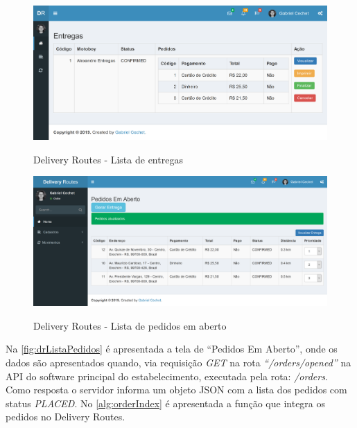  \begin{figure}[H]
    \centering
    \caption{Delivery Routes - Lista de entregas}
    \includegraphics[width=1.0\textwidth]{./dados/figuras/fig26}
    \label{fig:drListaEntregas}
\end{figure}

 \begin{figure}[H]
    \centering
    \caption{Delivery Routes - Lista de pedidos em aberto}
    \includegraphics[width=1.0\textwidth]{./dados/figuras/fig29}
    \label{fig:drListaPedidos}
\end{figure}

\newpage
Na \autoref{fig:drListaPedidos} é apresentada a tela de “Pedidos Em Aberto”, onde os dados são apresentados quando, via requisição \textit{GET} na rota \textit{“/orders/opened”} na API do software principal do estabelecimento, executada pela rota: \textit{/orders}. Como resposta o servidor informa um objeto JSON com a lista dos pedidos com status \textit{PLACED}. No \autoref{alg:orderIndex} é apresentada a função que integra os pedidos no Delivery Routes.

